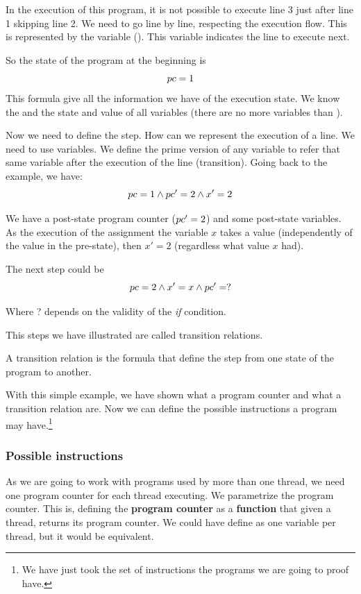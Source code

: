 In the execution of this program, it is not possible to execute line 3 just after line 1 skipping line 2. We need to go line by line, respecting the execution flow. 
This is represented by the variable \pc (). This variable indicates the line to execute next.

So the state of the program at the beginning is 
%
\[ pc = 1\]
%
This formula give all the information we have of the execution state. 
We know the \pc\; and the state and value of all variables (there are no more variables than \pc).

Now we need to define the step. 
%
How can we represent the execution of a line.
%
We need to use  variables. 
%
We define the prime version of any variable to refer that same variable after the execution of the line (transition). 
%
Going back to the example, we have:
%
\[
pc = 1 \wedge pc'=2 \wedge x'=2 
\]

We have a post-state program counter ($pc'=2$) and some post-state variables. 
%
As the execution of the assignment the variable $x$ takes a value (independently of the value in the pre-state), then $x'=2$ (regardless what value $x$ had). 

The next step could be
\[
pc = 2 \wedge x'=x \wedge 	pc'=?
\]

Where ? depends on the validity of the \textit{if} condition. 

This steps we have illustrated are called transition relations.

\begin{defn}
A transition relation is the formula that define the step from one state of the program to another.  
\end{defn}

With this simple example, we have shown what a program counter and what a transition relation are. Now we can define the possible instructions a program may have.\footnote{We have just took the set of instructions the programs we are going to proof have.}

\subsubsection{Possible instructions}
As we are going to work with programs used by more than one thread, we need one program counter for each thread executing. 
%
We parametrize the program counter. 
%
This is, defining the \textbf{program counter} as a \textbf{function} that given a thread, returns its program counter. 
%
We could have define as one variable per thread, but it would be equivalent. 

